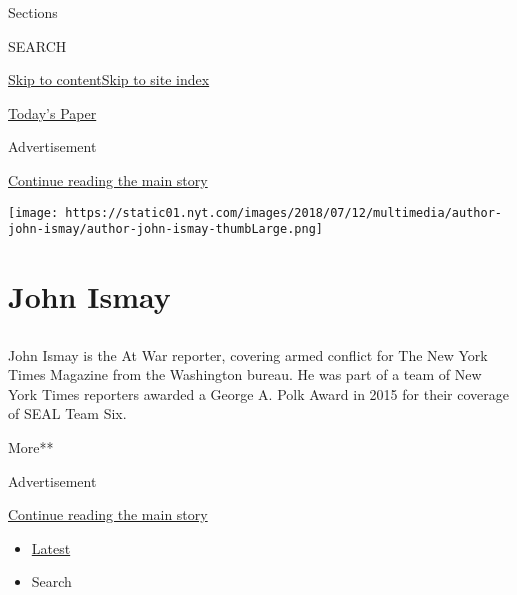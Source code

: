 Sections

SEARCH

\protect\hyperlink{site-content}{Skip to
content}\protect\hyperlink{site-index}{Skip to site index}

\href{https://myaccount.nytimes.com/auth/login?response_type=cookie\&client_id=vi}{}

\href{https://www.nytimes.com/section/todayspaper}{Today's Paper}

Advertisement

\protect\hyperlink{after-top}{Continue reading the main story}

\texttt{[image: https://static01.nyt.com/images/2018/07/12/multimedia/author-john-ismay/author-john-ismay-thumbLarge.png]}

\hypertarget{john-ismay}{%
\section{John Ismay}\label{john-ismay}}

\subsection{}

John Ismay is the At War reporter, covering armed conflict for The New
York Times Magazine from the Washington bureau. He was part of a team of
New York Times reporters awarded a George A. Polk Award in 2015 for
their coverage of SEAL Team Six.~

More**

Advertisement

\protect\hyperlink{after-mid1}{Continue reading the main story}

\begin{itemize}
\tightlist
\item
  \protect\hyperlink{stream-panel}{Latest}
\item
  Search
\end{itemize}

